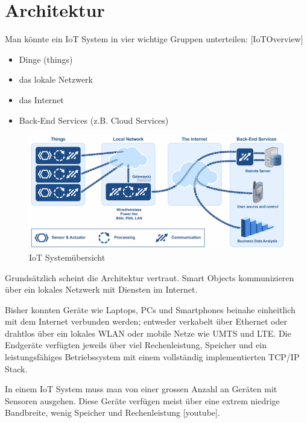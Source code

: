 \section{Architektur}
Man könnte ein IoT System in vier wichtige Gruppen unterteilen: [IoTOverview]
\begin{itemize}
\item Dinge (things)
\item das lokale Netzwerk
\item das Internet
\item Back-End Services (z.B. Cloud Services)
\end{itemize}
\begin{figure}[H]
\centering
\includegraphics[scale=0.8]{images/iot_system_overview_by_micrium.png}
\caption{IoT Systemübersicht\cite{IoTOverview}}
\end{figure}
Grundsätzlich scheint die Architektur vertraut. Smart Objects kommunizieren über ein lokales Netzwerk mit Diensten im Internet.

Bisher konnten Geräte wie Laptops, PCs und Smartphones beinahe einheitlich mit dem Internet verbunden werden; entweder verkabelt über Ethernet oder drahtlos über ein lokales WLAN oder mobile Netze wie UMTS und LTE. Die Endgeräte verfügten jeweils über viel Rechenleistung, Speicher und ein leistungsfähiges Betriebssystem mit einem vollständig implementierten TCP/IP Stack. 

In einem IoT System muss man von einer grossen Anzahl an Geräten mit Sensoren ausgehen. Diese Geräte verfügen meist über eine extrem niedrige Bandbreite, wenig Speicher und Rechenleistung [youtube].
